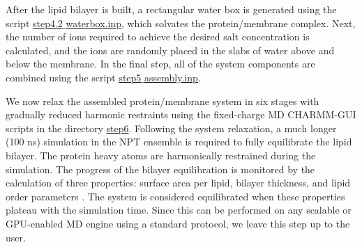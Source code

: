 After the lipid bilayer is built, a rectangular water box is generated using the script \href{https://gitlab.com/shenlab-amber-cphmd/cphmd-tutorial/-/tree/main/memb_hphmd_charmm/initial_system_prep/step1-5/step4.2_waterbox.inp}{step4.2$\_$waterbox.inp}, which solvates the protein/membrane complex.
Next, the number of ions required to achieve the desired salt concentration is calculated, 
and the ions are randomly placed in the slabs of water above and below the membrane. 
In the final step, all of the system components are combined using the script \href{https://gitlab.com/shenlab-amber-cphmd/cphmd-tutorial/-/tree/main/memb_hphmd_charmm/initial_system_prep/step1-5/step5_assembly.inp}{step5$\_$assembly.inp}.

We now relax the assembled protein/membrane system in six stages with gradually reduced harmonic 
restraints using the fixed-charge MD CHARMM-GUI scripts in the directory
\href{https://gitlab.com/shenlab-amber-cphmd/cphmd-tutorial/-/tree/main/memb_hphmd_charmm/initial_system_prep/step6}{step6}.
Following the system relaxation, a much longer (100 ns) simulation in the NPT ensemble is required to fully equilibrate the lipid bilayer.
The protein heavy atoms are harmonically restrained during the simulation.
The progress of the bilayer equilibration is monitored by
the calculation of three properties: surface area per lipid, bilayer thickness, and lipid order parameters \cite{Klauda_Pastor_2010_J.Phys.Chem.B,Huang_Shen_2021_MethodsinMolecularBiology}. 
The system is considered equilibrated when these properties plateau with the simulation time.
Since this can be performed on any scalable or GPU-enabled MD engine using a standard protocol, we leave this step up to the user.


